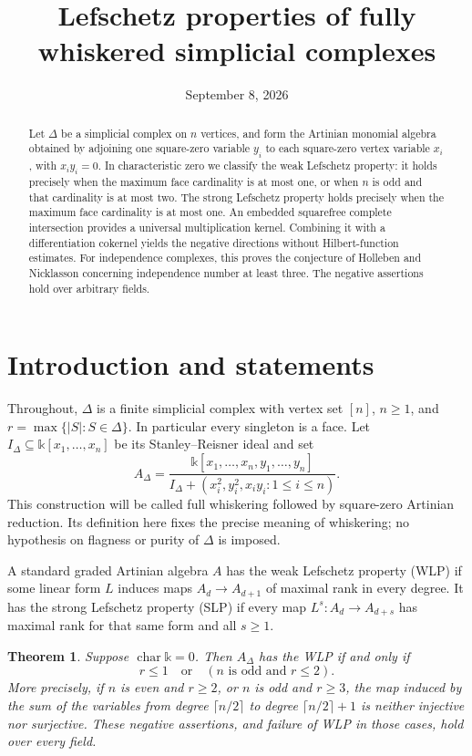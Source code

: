 \documentclass[11pt]{article}
\title{Lefschetz properties of fully whiskered simplicial complexes}
\author{}
\date{September 8, 2026}
\newtheorem{theorem}{Theorem}[section]
\theoremstyle{remark}
\newcommand{\kk}{\mathbb{k}}
\newcommand{\A}{{A_{\Delta}}}
\begin{document}
\maketitle
\begin{abstract}
Let $\Delta$ be a simplicial complex on $n$ vertices, and form the Artinian monomial algebra obtained by adjoining one square-zero variable $y_i$ to each square-zero vertex variable $x_i$, with $x_i y_i=0$. In characteristic zero we classify the weak Lefschetz property: it holds precisely when the maximum face cardinality is at most one, or when $n$ is odd and that cardinality is at most two. The strong Lefschetz property holds precisely when the maximum face cardinality is at most one. An embedded squarefree complete intersection provides a universal multiplication kernel. Combining it with a differentiation cokernel yields the negative directions without Hilbert-function estimates. For independence complexes, this proves the conjecture of Holleben and Nicklasson concerning independence number at least three. The negative assertions hold over arbitrary fields.
\end{abstract}

\section{Introduction and statements}
Throughout, $\Delta$ is a finite simplicial complex with vertex set $[n]$, $n\geq1$, and $r=\max\{|S|:S\in\Delta\}$. In particular every singleton is a face. Let $I_\Delta\subseteq\kk[x_1,\ldots,x_n]$ be its Stanley--Reisner ideal and set
\[
\A=\frac{\kk[x_1,\ldots,x_n,y_1,\ldots,y_n]}{I_\Delta+(x_i^2,y_i^2,x_i y_i:1\leq i\leq n)}.
\]
This construction will be called full whiskering followed by square-zero Artinian reduction. Its definition here fixes the precise meaning of whiskering; no hypothesis on flagness or purity of $\Delta$ is imposed.

A standard graded Artinian algebra $A$ has the weak Lefschetz property (WLP) if some linear form $L$ induces maps $A_d\to A_{d+1}$ of maximal rank in every degree. It has the strong Lefschetz property (SLP) if every map $L^s:A_d\to A_{d+s}$ has maximal rank for that same form and all $s\geq1$.

\begin{theorem}\label{thm:main}
Suppose $\operatorname{char}\kk=0$. Then $\A$ has the WLP if and only if
\[
r\leq1\quad\text{or}\quad (n\text{ is odd and }r\leq2).
\]
More precisely, if $n$ is even and $r\geq2$, or $n$ is odd and $r\geq3$, the map induced by the sum of the variables from degree $\lceil n/2\rceil$ to degree $\lceil n/2\rceil+1$ is neither injective nor surjective. These negative assertions, and failure of WLP in those cases, hold over every field.
\end{theorem}
\end{document}
